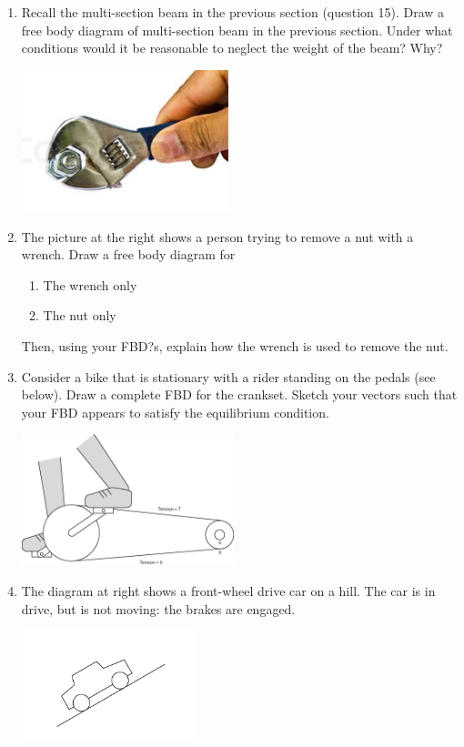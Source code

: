 \documentclass{tufte-handout}
\newcommand{\be}{\begin{enumerate}}
\newcommand{\ee}{\end{enumerate}}
\begin{document}
\begin{enumerate}
\begin{enumerate}[resume]
\item Recall the multi-section beam in the previous section (question 15).  Draw a free body diagram of multi-section beam in the previous section. Under what conditions would it be reasonable to neglect the weight of the beam?   Why?

\begin{marginfigure}
\includegraphics[width=6cm]{figs/inter1_wrench.jpg}
\end{marginfigure}

\item The picture at the right shows a person trying to remove a nut with a wrench.  Draw a free body diagram for 
\be \item The wrench only
\item The nut only 
\ee
Then, using your FBD?s, explain how the wrench is used to remove the nut. 
 

\item Consider a bike that is stationary with a rider standing on the pedals (see below). Draw a complete FBD for the crankset.  Sketch your vectors such that your FBD appears to satisfy the equilibrium condition.

\includegraphics[height=1.5in]{figs/BikePedal2}

\item The diagram at right shows a front-wheel drive car on a hill.  The car is in drive, but is not moving: the brakes are engaged.

\begin{marginfigure}

\includegraphics[width=2in]{figs/CarOnHills}


\end{marginfigure}
\end{enumerate}
\end{enumerate}
\end{document}

